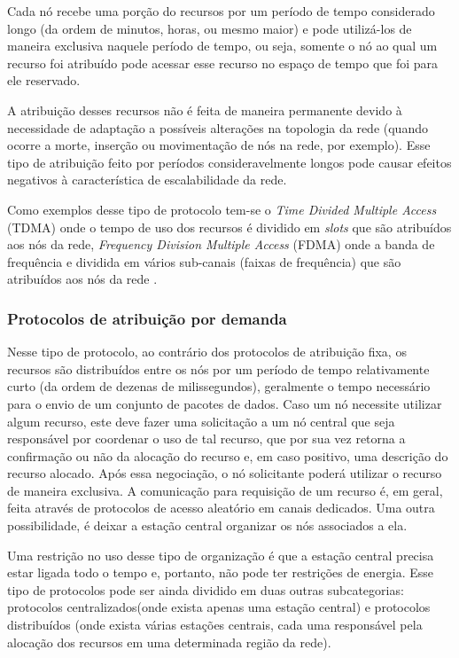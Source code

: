  Cada nó recebe uma porção do recursos por um período de tempo considerado longo (da ordem de minutos, horas, ou mesmo maior) e pode utilizá-los de maneira exclusiva naquele período de tempo, ou seja, somente o nó ao qual um recurso foi atribuído pode acessar esse recurso no espaço de tempo que foi para ele reservado. 
 
 A atribuição desses recursos não é feita de maneira permanente devido à necessidade de adaptação a possíveis alterações na topologia da rede (quando ocorre a morte, inserção ou movimentação de nós na rede, por exemplo). Esse tipo de atribuição feito por períodos consideravelmente longos pode causar efeitos negativos à característica de escalabilidade da rede. 
 
 Como exemplos desse tipo de protocolo tem-se o \textit{Time Divided Multiple Access} (TDMA) \cite{Kulkarni2004} onde o tempo de uso dos recursos é dividido em \textit{slots} que são atribuídos aos nós da rede, \textit{Frequency Division Multiple Access} (FDMA) onde a banda de frequência e dividida em vários sub-canais (faixas de frequência) que são atribuídos aos nós da rede \cite{Arms_frequencyagile}.
	
 \subsubsection{Protocolos de atribuição por demanda} 
 
 Nesse tipo de protocolo, ao contrário dos protocolos de atribuição fixa, os recursos são distribuídos entre os nós por um período de tempo relativamente curto (da ordem de dezenas de milissegundos), geralmente o tempo necessário para o envio de um conjunto de pacotes de dados. Caso um nó necessite utilizar algum recurso, este deve fazer uma solicitação a um nó central que seja responsável por coordenar o uso de tal recurso, que por sua vez retorna a confirmação ou não da alocação do recurso e, em caso positivo, uma descrição do recurso alocado. Após essa negociação, o nó solicitante poderá utilizar o recurso de maneira exclusiva. A comunicação para requisição de um recurso é, em geral, feita através de protocolos de acesso aleatório em canais dedicados. Uma outra possibilidade, é deixar a estação central organizar os nós associados a ela. 
 
 Uma restrição no uso desse tipo de organização é que a estação central precisa estar ligada todo o tempo e, portanto, não pode ter restrições de energia. Esse tipo de protocolos pode ser ainda dividido em duas outras subcategorias: protocolos centralizados(onde exista apenas uma estação central) e protocolos distribuídos (onde exista várias estações centrais, cada uma responsável pela alocação dos recursos em uma determinada região da rede). 
 
